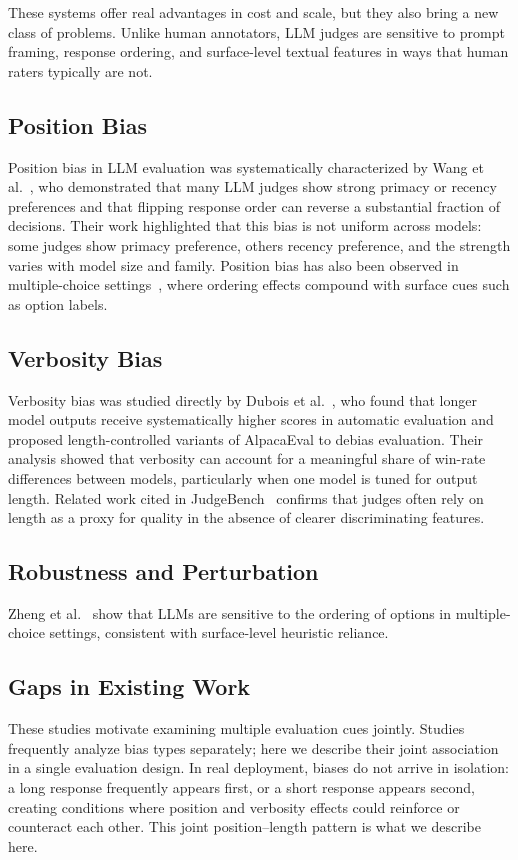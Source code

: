 \documentclass[10pt,conference]{IEEEtran}
\begin{document}
These systems offer real advantages in cost and scale, but they also bring a new class of problems. Unlike human annotators, LLM judges are sensitive to prompt framing, response ordering, and surface-level textual features in ways that human raters typically are not.

\subsection{Position Bias}
Position bias in LLM evaluation was systematically characterized by Wang et al.~\cite{wang2024fair}, who demonstrated that many LLM judges show strong primacy or recency preferences and that flipping response order can reverse a substantial fraction of decisions. Their work highlighted that this bias is not uniform across models: some judges show primacy preference, others recency preference, and the strength varies with model size and family. Position bias has also been observed in multiple-choice settings~\cite{zheng2023mcq}, where ordering effects compound with surface cues such as option labels.

\subsection{Verbosity Bias}
Verbosity bias was studied directly by Dubois et al.~\cite{dubois2025lc}, who found that longer model outputs receive systematically higher scores in automatic evaluation and proposed length-controlled variants of AlpacaEval to debias evaluation. Their analysis showed that verbosity can account for a meaningful share of win-rate differences between models, particularly when one model is tuned for output length. Related work cited in JudgeBench~\cite{tan2025judgebench} confirms that judges often rely on length as a proxy for quality in the absence of clearer discriminating features.

\subsection{Robustness and Perturbation}
Zheng et al.~\cite{zheng2023mcq} show that LLMs are sensitive to the ordering of options in multiple-choice settings, consistent with surface-level heuristic reliance.

\subsection{Gaps in Existing Work}
These studies motivate examining multiple evaluation cues jointly. Studies frequently analyze bias types separately; here we describe their joint association in a single evaluation design. In real deployment, biases do not arrive in isolation: a long response frequently appears first, or a short response appears second, creating conditions where position and verbosity effects could reinforce or counteract each other. This joint position--length pattern is what we describe here.
\end{document}
